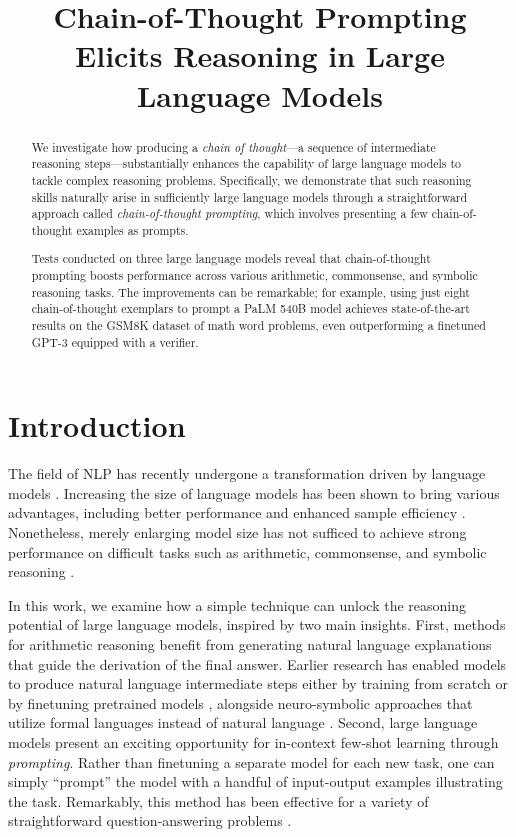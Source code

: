 \title{Chain-of-Thought Prompting Elicits Reasoning in Large Language Models}

\begin{abstract}
We investigate how producing a \textit{chain of thought}—a sequence of intermediate reasoning steps—substantially enhances the capability of large language models to tackle complex reasoning problems. Specifically, we demonstrate that such reasoning skills naturally arise in sufficiently large language models through a straightforward approach called \textit{chain-of-thought prompting}, which involves presenting a few chain-of-thought examples as prompts.

Tests conducted on three large language models reveal that chain-of-thought prompting boosts performance across various arithmetic, commonsense, and symbolic reasoning tasks. The improvements can be remarkable; for example, using just eight chain-of-thought exemplars to prompt a PaLM 540B model achieves state-of-the-art results on the GSM8K dataset of math word problems, even outperforming a finetuned GPT-3 equipped with a verifier.
\end{abstract}

\section{Introduction}
The field of NLP has recently undergone a transformation driven by language models \citep[][\textit{inter alia}]{peters-etal-2018-deep,devlin-etal-2019-bert,brown2020language}. Increasing the size of language models has been shown to bring various advantages, including better performance and enhanced sample efficiency \citep[\textit{inter alia}]{kaplan2020scaling,brown2020language}. Nonetheless, merely enlarging model size has not sufficed to achieve strong performance on difficult tasks such as arithmetic, commonsense, and symbolic reasoning \citep{rae2021scaling}.

In this work, we examine how a simple technique can unlock the reasoning potential of large language models, inspired by two main insights. First, methods for arithmetic reasoning benefit from generating natural language explanations that guide the derivation of the final answer. Earlier research has enabled models to produce natural language intermediate steps either by training from scratch \citep{ling-etal-2017-program} or by finetuning pretrained models \citep{cobbe2021training}, alongside neuro-symbolic approaches that utilize formal languages instead of natural language \citep{roy-roth-2015-solving, chiang-chen-2019-semantically,amini-etal-2019-mathqa, chen2019neural}. Second, large language models present an exciting opportunity for in-context few-shot learning through \emph{prompting}. Rather than finetuning a separate model for each new task, one can simply ``prompt'' the model with a handful of input-output examples illustrating the task. Remarkably, this method has been effective for a variety of straightforward question-answering problems \citep{brown2020language}.

